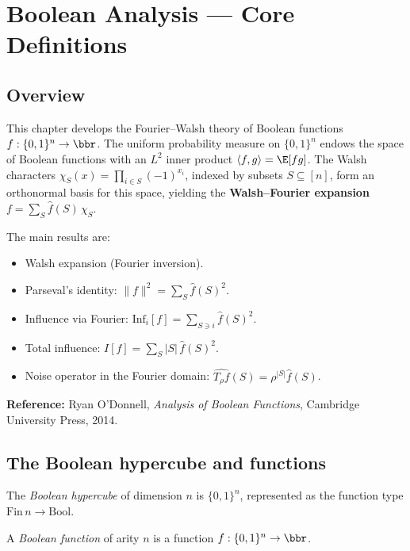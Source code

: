 \chapter{Boolean Analysis — Core Definitions}
\section{Overview}

This chapter develops the Fourier--Walsh theory of Boolean functions
$f : \{0,1\}^n \to \bbr$.  The uniform probability measure on $\{0,1\}^n$
endows the space of Boolean functions with an $L^2$ inner product
$\langle f, g\rangle = \E[fg]$.  The Walsh characters
$\chi_S(x) = \prod_{i\in S}(-1)^{x_i}$, indexed by subsets $S\subseteq[n]$,
form an orthonormal basis for this space, yielding the \textbf{Walsh--Fourier
expansion} $f = \sum_S \hat f(S)\,\chi_S$.

The main results are:
\begin{itemize}
  \item Walsh expansion (Fourier inversion).
  \item Parseval's identity: $\|f\|^2 = \sum_S \hat f(S)^2$.
  \item Influence via Fourier: $\mathrm{Inf}_i[f] = \sum_{S\ni i}\hat f(S)^2$.
  \item Total influence: $I[f] = \sum_S |S|\,\hat f(S)^2$.
  \item Noise operator in the Fourier domain: $\widehat{T_\rho f}(S) = \rho^{|S|}\hat f(S)$.
\end{itemize}

\textbf{Reference:} Ryan O'Donnell, \emph{Analysis of Boolean Functions},
Cambridge University Press, 2014.

\section{The Boolean hypercube and functions}

\begin{definition}
\leanok
The \emph{Boolean hypercube} of dimension $n$ is $\{0,1\}^n$,
represented as the function type $\mathrm{Fin}\,n \to \mathrm{Bool}$.
\end{definition}

\begin{definition}
\leanok
{}
A \emph{Boolean function} of arity $n$ is a function $f : \{0,1\}^n \to \bbr$.
\end{definition}

